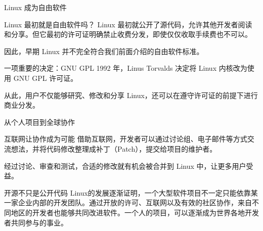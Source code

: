 \documentclass[aspectratio=169]{beamer}
\begin{document}
\begin{frame}{Linux 成为自由软件}
	\begin{block}{Linux 最初就是自由软件吗？}
		\hspace*{2em}Linux 最初就公开了源代码，允许其他开发者阅读和分享。但它最初的许可证明确禁止收费分发，即使仅仅收取手续费也不可以。
		\par\hspace*{2em}因此，早期 Linux 并不完全符合我们前面介绍的自由软件标准。
	\end{block}	
	\begin{block}{一项重要的决定：GNU GPL}
		\hspace*{2em}1992 年，Linus Torvalds 决定将 Linux 内核改为使用 GNU GPL 许可证。
		\par\hspace*{2em}从此，用户不仅能够研究、修改和分享 Linux，还可以在遵守许可证的前提下进行商业分发。
	\end{block}
\end{frame}


\begin{frame}{从个人项目到全球协作}
	
	\begin{block}{互联网让协作成为可能}
		\hspace*{2em}借助互联网，开发者可以通过讨论组、电子邮件等方式交流想法，并将代码修改整理成补丁（Patch），提交给项目的维护者。
		
		\par\hspace*{2em}经过讨论、审查和测试，合适的修改就有机会被合并到 Linux 中，让更多用户受益。
	\end{block}

	\begin{block}{开源不只是公开代码}
		\hspace*{2em}Linux的发展逐渐证明，一个大型软件项目不一定只能依靠某一家企业内部的开发团队。通过开放的许可、互联网以及有效的社区协作，来自不同地区的开发者也能够共同改进软件。\alert{一个人的项目，可以逐渐成为世界各地开发者共同参与的事业。}
	\end{block}
\end{frame}
\end{document}
